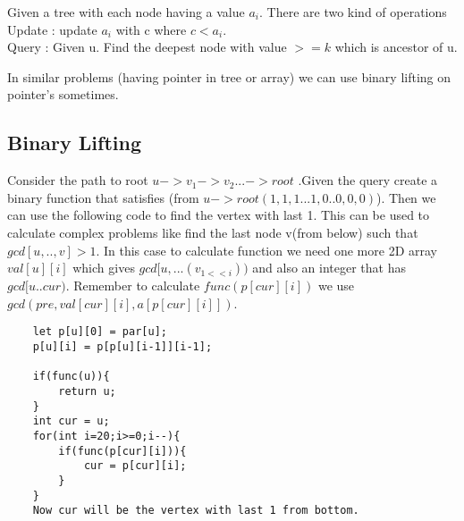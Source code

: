 \documentclass[../Notes.tex]{subfiles}
\begin{document}
Given a tree with each node having a value $a_{i}$. There are two kind of operations\\
Update : update $a_{i}$ with c where $c<a_{i}$.\\
Query : Given u. Find the deepest node with value $>= k$ which is ancestor of u.

In similar problems (having pointer in tree or array) we can use binary lifting on pointer's sometimes.\\

\subsection{Binary Lifting}
Consider the path to root $u->v_1->v_2...->root$ .Given the query create a binary function that satisfies (from $u -> root (1,1,1...1,0..0,0,0)$). Then we can use the following code to find the vertex with last 1. This can be used to calculate complex problems like find the last node v(from below) such that $gcd[u,..,v]>1$. In this case to calculate function we need one more 2D array $val[u][i]$ which gives $gcd[u,...(v_{1<<i}))$ and also an integer that has $gcd[u..cur)$. Remember to calculate $func(p[cur][i])$ we use $gcd(pre,val[cur][i],a[p[cur][i]])$.

\begin{lstlisting}
	let p[u][0] = par[u];
	p[u][i] = p[p[u][i-1]][i-1];
	
	if(func(u)){
		return u;
	}
	int cur = u;
	for(int i=20;i>=0;i--){
		if(func(p[cur][i])){
			cur = p[cur][i];		
		}	
	}
	Now cur will be the vertex with last 1 from bottom.	
	   		
\end{lstlisting}
\end{document}
